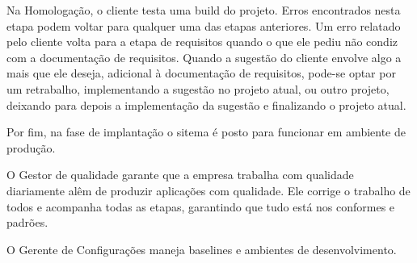 \documentclass[
	12pt, %
]{fphw}
\begin{document}
\begin{doublespace}
Na Homologação, o cliente testa uma build do projeto. Erros encontrados nesta etapa podem voltar para qualquer uma das etapas anteriores. Um erro relatado pelo cliente volta para a etapa de requisitos quando o que ele pediu não condiz com a documentação de requisitos. Quando a sugestão do cliente envolve algo a mais que ele deseja, adicional à documentação de requisitos, pode-se optar por um retrabalho, implementando a sugestão no projeto atual, ou outro projeto, deixando para depois a implementação da sugestão e finalizando o projeto atual.

Por fim, na fase de implantação o sitema é posto para funcionar em ambiente de produção.

O Gestor de qualidade garante que a empresa trabalha com qualidade diariamente alêm de produzir aplicações com qualidade. Ele corrige o trabalho de todos e acompanha todas as etapas, garantindo que tudo está nos conformes e padrões.

O Gerente de Configurações maneja baselines e ambientes de desenvolvimento.

\end{doublespace}
\end{document}
